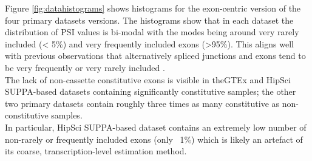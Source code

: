 Figure \ref{fig:datahistograms} shows histograms for the exon-centric version of the four primary datasets versions. The histograms show that in each dataset the distribution of PSI values is bi-modal with the modes being around very rarely included (< 5\%) and very frequently included exons (>95\%). This aligns well with previous observations that alternatively spliced junctions and exons tend to be very frequently or very rarely included \cite{buschhertel} \cite{bimodalpsivalues1} \cite{bimodalpsivalues2}.\\
The lack of non-cassette constitutive exons is visible in theGTEx and HipSci SUPPA-based datasets containing significantly constitutive samples; the other two primary datasets contain roughly three times as many constitutive as non-constitutive samples. \\
In particular, HipSci SUPPA-based dataset contains an extremely low number of non-rarely or frequently included exons (only ~1\%) which is likely an artefact of its coarse, transcription-level estimation method.\\

